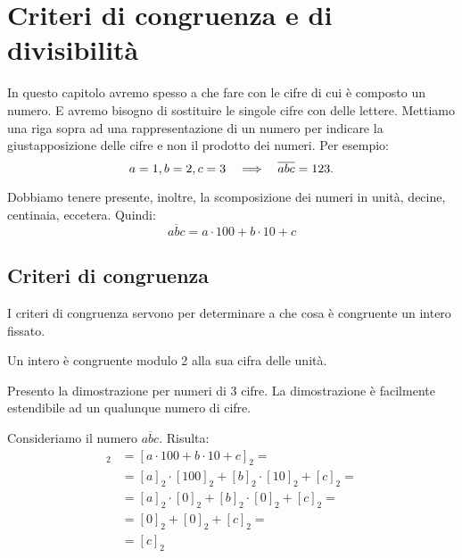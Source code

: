 \chapter{Criteri di congruenza e di divisibilità}
\label{ch:criteri_congruenza}

In questo capitolo avremo spesso a che fare con le cifre di cui è composto un numero.
E avremo bisogno di sostituire le singole cifre con delle lettere.
Mettiamo una riga sopra ad una rappresentazione di un numero per indicare la giustapposizione delle cifre e non il prodotto dei numeri.
Per esempio:
\begin{equation*}
    a=1, b=2, c=3  \quad\Longrightarrow\quad  \overline{abc} = 123.
\end{equation*}

Dobbiamo tenere presente, inoltre, la scomposizione dei numeri in unità, decine, centinaia, eccetera.
Quindi:
\begin{equation*}
    \overline{abc} = a \cdot 100 + b \cdot 10 + c
\end{equation*}

\section{Criteri di congruenza}
\label{sec:criteri_congruenza}

I criteri di congruenza servono per determinare a che cosa è congruente un intero fissato.

\begin{teorema}
    Un intero è congruente modulo 2 alla sua cifra delle unità.

    Presento la dimostrazione per numeri di 3 cifre.
    La dimostrazione è facilmente estendibile ad un qualunque numero di cifre.

    Consideriamo il numero $\overline{abc}$.
    Risulta:
    \begin{align*}
        [\overline{abc}]_2 &= [a \cdot 100 + b \cdot 10 + c]_2 = \\
        &= [a]_2 \cdot [100]_2 + [b]_2 \cdot [10]_2 + [c]_2 = \\
        &= [a]_2 \cdot [0]_2 + [b]_2 \cdot [0]_2 + [c]_2 = \\
        &= [0]_2 + [0]_2 + [c]_2 = \\
        &= [c]_2
    \end{align*}
\end{teorema}

